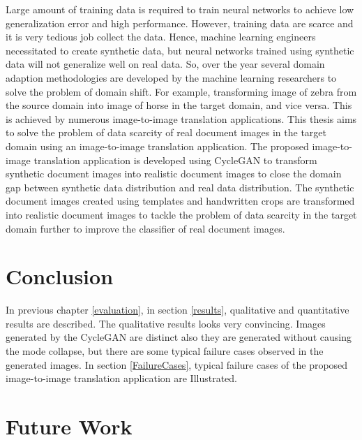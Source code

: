 Large amount of training data is required to train neural networks to achieve low generalization error and high performance. However, training data are scarce and it is very tedious job collect the data. Hence, machine learning engineers necessitated to create synthetic data, but neural networks trained using synthetic data will not generalize well on real data. So, over the year several domain adaption methodologies are developed by the machine learning researchers to solve the problem of domain shift. For example, transforming image of zebra from the source domain into image of horse in the target domain, and vice versa. This is achieved by numerous image-to-image translation applications. This thesis aims to solve the problem of data scarcity of real document images in the target domain using an image-to-image translation application. The proposed image-to-image translation application is developed using \ac{CycleGAN} to transform synthetic document images into realistic document images to close the domain gap between synthetic data distribution and real data distribution. The synthetic document images created using templates and handwritten crops are transformed into realistic document images to tackle the problem of data scarcity in the target domain further to improve the classifier of real document images. 



\section{Conclusion}\label{Conclusion}

In previous chapter \ref{evaluation}, in section \ref{results}, qualitative and quantitative results are described. The qualitative results looks very convincing. Images generated by the \ac{CycleGAN} are distinct also they are generated without causing the mode collapse, but there are some typical failure cases observed in the generated images. In section \ref{FailureCases}, typical failure cases of the proposed image-to-image translation application are Illustrated.





\section{Future Work}\label{FutureWork}

